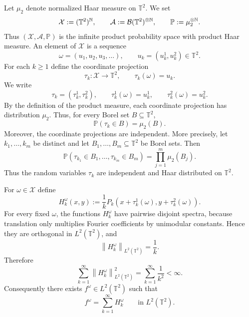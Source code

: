 \documentclass[11pt]{amsart}
\numberwithin{equation}{section}
\begin{document}
Let $\mu_2$ denote normalized Haar measure on $\mathbb{T}^2$. We set 
\begin{equation*}
\mathcal{X}:=(\mathbb{T}^2)^{\mathbb{N}},\qquad \mathcal{A}:=\mathcal{B}(%
\mathbb{T}^2)^{\otimes \mathbb{N}},\qquad \mathbb{P}:=\mu_2^{\otimes \mathbb{%
N}}.
\end{equation*}
Thus $(\mathcal{X},\mathcal{A},\mathbb{P})$ is the infinite product
probability space with product Haar measure. An element of $\mathcal{X}$ is
a sequence 
\begin{equation*}
\omega=(u_1,u_2,u_3,\ldots), \qquad u_k=(u_k^1,u_k^2)\in\mathbb{T}^2.
\end{equation*}
For each $k\ge1$ define the coordinate projection 
\begin{equation*}
\tau_k:\mathcal{X}\to\mathbb{T}^2, \qquad \tau_k(\omega)=u_k.
\end{equation*}
We write 
\begin{equation*}
\tau_k=(\tau_k^1,\tau_k^2), \qquad \tau_k^1(\omega)=u_k^1, \qquad
\tau_k^2(\omega)=u_k^2.
\end{equation*}
By the definition of the product measure, each coordinate projection has
distribution $\mu_2$. Thus, for every Borel set $B\subseteq\mathbb{T}^2$, 
\begin{equation*}
\mathbb{P}(\tau_k\in B)=\mu_2(B).
\end{equation*}
Moreover, the coordinate projections are independent. More precisely, let $%
k_1,\ldots,k_m$ be distinct and let $B_1,\ldots,B_m\subseteq\mathbb{T}^2$ be
Borel sets. Then 
\begin{equation*}
\mathbb{P}(\tau_{k_1}\in B_1,\ldots,\tau_{k_m}\in B_m) =\prod_{j=1}^m
\mu_2(B_j).
\end{equation*}
Thus the random variables $\tau_k$ are independent and Haar distributed on $%
\mathbb{T}^2$.

For $\omega\in\mathcal{X}$ define 
\begin{equation}  \label{eq:Hk}
H_k^\omega(x,y):=\frac1k P_k(x+\tau_k^1(\omega),y+\tau_k^2(\omega)).
\end{equation}
For every fixed $\omega$, the functions $H_k^\omega$ have pairwise disjoint
spectra, because translation only multiplies Fourier coefficients by
unimodular constants. Hence they are orthogonal in $L^2(\mathbb{T}^2)$, and 
\begin{equation*}
\left\|H_k^\omega\right\|_{L^2(\mathbb{T}^2)}=\frac1k.
\end{equation*}
Therefore 
\begin{equation*}
\sum_{k=1}^{\infty}\left\|H_k^\omega\right\|_{L^2(\mathbb{T}^2)}^2
=\sum_{k=1}^{\infty}\frac1{k^2}<\infty.
\end{equation*}
Consequently there exists $f^\omega\in L^2(\mathbb{T}^2)$ such that 
\begin{equation}  \label{eq:fomega}
f^\omega=\sum_{k=1}^{\infty}H_k^\omega \qquad\text{in }L^2(\mathbb{T}^2).
\end{equation}
\end{document}
